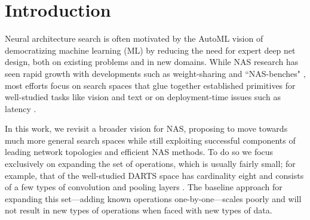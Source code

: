 
\section{Introduction}

Neural architecture search is often motivated by the \mbox{AutoML} vision of democratizing machine learning (ML) by reducing the need for expert deep net design, both on existing problems and in new domains.
While NAS research has seen rapid growth with developments such as weight-sharing \citep{pham2018enas} and ``NAS-benches" \citep{ying2019nasbench101,zela2020nasbench1shot1}, most efforts focus on search spaces that glue together established primitives for well-studied tasks like vision and text \citep{liu2019darts,li2019rsws,xu2020pcdarts,li2021gaea} or on deployment-time issues such as latency \citep{cai2020ofa}.

In this work, we revisit a broader vision for NAS, proposing to move towards much more general search spaces while still exploiting successful components of leading network topologies and efficient NAS methods.
To do so we focus exclusively on expanding the set of operations, which is usually fairly small;
for example, that of the well-studied DARTS space has cardinality eight and consists of a few types of convolution and pooling layers \citep{liu2019darts}.
The baseline approach for expanding this set---adding known operations one-by-one---scales poorly and will not result in new types of operations when faced with new types of data.


